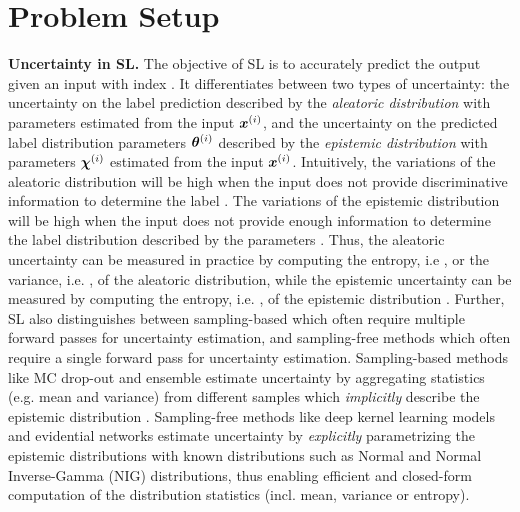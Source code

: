 \vspace{-3mm}
\section{Problem Setup}
\label{sec:setup}

\textbf{Uncertainty in SL.} The objective of SL is to accurately predict the output \smash{$\y\dataix$} given an input \smash{$\x\dataix$} with index \smash{$\idata$}. It differentiates between two types of uncertainty: the uncertainty on the label prediction \smash{$\y\dataix$} described by the \emph{aleatoric distribution} \smash{$\prob(\y\dataix \mid \expparam\dataix)$} with parameters \smash{$\expparam\dataix$} estimated from the input $\x\dataix$, and the uncertainty on the predicted label distribution parameters $\expparam\dataix$ described by the \emph{epistemic distribution} \smash{$\prior(\expparam\dataix \mid \priorparam\dataix)$} with parameters $\priorparam\dataix$ estimated from the input $\x\dataix$. Intuitively, the variations of the aleatoric distribution will be high when the input \smash{$\x\dataix$} does not provide discriminative information to determine the label \smash{$\y\dataix$}. The variations of the epistemic distribution will be high when the input \smash{$\x\dataix$} does not provide enough information to determine the label distribution \smash{$\prior(\expparam\dataix \mid \priorparam\dataix)$} described by the parameters \smash{$\priorparam\dataix$}. Thus, the aleatoric uncertainty can be measured in practice by computing the entropy, i.e , or the variance, i.e. , of the aleatoric distribution, while the epistemic uncertainty can be measured by computing the entropy, i.e. , of the epistemic distribution \cite{priornet, postnet, natpn}. Further, SL also distinguishes between sampling-based which often require multiple forward passes for uncertainty estimation, and sampling-free methods which often require a single forward pass for uncertainty estimation. Sampling-based methods like MC drop-out \cite{dropout} and ensemble \cite{ensembles, hyper-ensembles, batch-ensembles} estimate uncertainty by aggregating statistics (e.g. mean and variance) from different samples which \emph{implicitly} describe the epistemic distribution \smash{$\prior(\expparam\dataix \mid \priorparam\dataix)$}. Sampling-free methods like deep kernel learning models \cite{simple-baseline-uncertainty, due, duq, uceloss} and evidential networks \cite{postnet, priornet, natpn, evidential-regression} estimate uncertainty by \emph{explicitly} parametrizing the epistemic distributions \smash{$\prior(\expparam\dataix) \mid \priorparam\dataix)$} with known distributions such as Normal and Normal Inverse-Gamma (NIG) distributions, thus enabling efficient and closed-form computation of the distribution statistics (incl. mean, variance or entropy).

